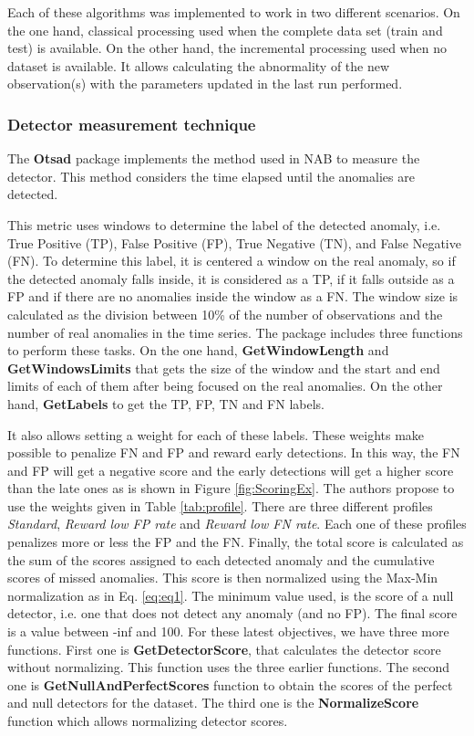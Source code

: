 \documentclass[a4paper]{article}\usepackage[]{graphicx}\usepackage[]{color}
\begin{document}
Each of these algorithms was implemented to work in two different scenarios. On the one hand, classical processing used when the complete data set (train and test) is available. On the other hand, the incremental processing used when no dataset is available. It allows calculating the abnormality of the new observation(s) with the parameters updated in the last run performed.

\subsubsection{Detector measurement technique} \label{S:3.1.2}

The \textbf{Otsad} package implements the method used in NAB \cite{7424283} to measure the detector. This method considers the time elapsed until the anomalies are detected.

This metric uses windows to determine the label of the detected anomaly, i.e. True Positive (TP), False Positive (FP), True Negative (TN), and False Negative (FN). To determine this label, it is centered a window on the real anomaly, so if the detected anomaly falls inside, it is considered as a TP, if it falls outside as a FP and if there are no anomalies inside the window as a FN.  The window size is calculated as the division between 10\% of the number of observations and the number of real anomalies in the time series. The package includes three functions to perform these tasks. On the one hand, \textbf{GetWindowLength} and \textbf{GetWindowsLimits} that gets the size of the window and the start and end limits of each of them after being focused on the real anomalies. On the other hand, \textbf{GetLabels} to get the TP, FP, TN and FN labels.


It also allows setting a weight for each of these labels. These weights make possible to penalize FN and FP and reward early detections. In this way, the FN and FP will get a negative score and the early detections will get a higher score than the late ones as is shown in Figure \ref{fig:ScoringEx}. The authors propose to use the weights given in Table \ref{tab:profile}. There are three different profiles \emph{Standard}, \emph{Reward low FP rate} and \emph{Reward low FN rate}. Each one of these profiles penalizes more or less the FP and the FN. Finally, the total score is calculated as the sum of the scores assigned to each detected anomaly and the cumulative scores of missed anomalies. This score is then normalized using the Max-Min normalization as in Eq. \ref{eq:eq1}. The minimum value used, is the score of a null detector, i.e. one that does not detect any anomaly (and no FP). The final score is a value between -inf and 100. For these latest objectives, we have three more functions. First one is \textbf{GetDetectorScore}, that calculates the detector score without normalizing. This function uses the three earlier functions. The second one is  \textbf{GetNullAndPerfectScores} function to obtain the scores of the perfect and null detectors for the dataset. The third one is the \textbf{NormalizeScore} function which allows normalizing detector scores.
\end{document}
